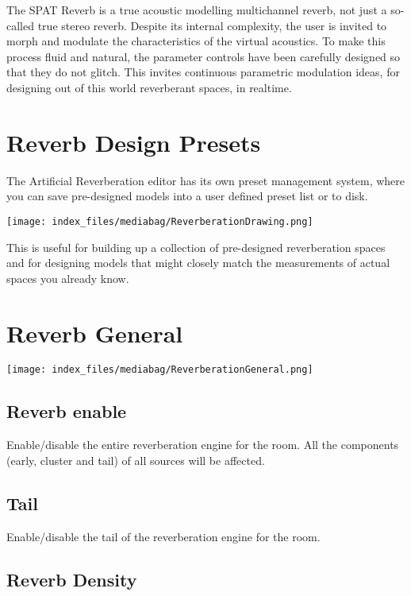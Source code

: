 \documentclass[
  letterpaper,
  DIV=11,
  numbers=noendperiod]{scrreport}
\begin{document}
The SPAT Reverb is a true acoustic modelling multichannel reverb, not
just a so-called true stereo reverb. Despite its internal complexity,
the user is invited to morph and modulate the characteristics of the
virtual acoustics. To make this process fluid and natural, the parameter
controls have been carefully designed so that they do not glitch. This
invites continuous parametric modulation ideas, for designing out of
this world reverberant spaces, in realtime.

\hypertarget{reverb-design-presets}{%
\section{Reverb Design Presets}\label{reverb-design-presets}}

The Artificial Reverberation editor has its own preset management
system, where you can save pre-designed models into a user defined
preset list or to disk.

\texttt{[image: index\_files/mediabag/ReverberationDrawing.png]}

This is useful for building up a collection of pre-designed
reverberation spaces and for designing models that might closely match
the measurements of actual spaces you already know.

\hypertarget{reverb-general}{%
\section{Reverb General}\label{reverb-general}}

\texttt{[image: index\_files/mediabag/ReverberationGeneral.png]}

\hypertarget{reverb-enable}{%
\subsection{Reverb enable}\label{reverb-enable}}

Enable/disable the entire reverberation engine for the room. All the
components (early, cluster and tail) of all sources will be affected.

\hypertarget{tail}{%
\subsection{Tail}\label{tail}}

Enable/disable the tail of the reverberation engine for the room.

\hypertarget{reverb-density}{%
\subsection{Reverb Density}\label{reverb-density}}
\end{document}
